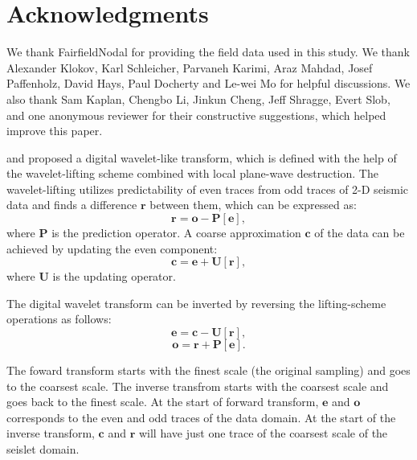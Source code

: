 \section{Acknowledgments}
We thank FairfieldNodal for providing the field data used in this study. We thank Alexander Klokov, Karl Schleicher, Parvaneh Karimi, Araz Mahdad, Josef Paffenholz, David Hays, Paul Docherty and Le-wei Mo for helpful discussions. We also thank Sam Kaplan, Chengbo Li, Jinkun Cheng, Jeff Shragge, Evert Slob, and one anonymous reviewer for their constructive suggestions, which helped improve this paper. 


\newpage
\onecolumn


\newpage
{}
\cite{fomel4} and \cite{seislet} proposed a digital wavelet-like transform, which is defined with the help of the wavelet-lifting scheme \cite[]{lifting} combined with local plane-wave destruction. The wavelet-lifting utilizes predictability of even traces from odd traces of 2-D seismic data and finds a difference $\mathbf{r}$ between them, which can be expressed as:
\begin{equation}
\label{eq:one}
\mathbf{r}=\mathbf{o}-\mathbf{P\left[e\right]},
\end{equation}
where $\mathbf{P}$ is the prediction operator.
A coarse approximation $\mathbf{c}$ of the data can be achieved by updating the even component:
\begin{equation}
\label{eq:two}
\mathbf{c}=\mathbf{e}+\mathbf{U\left[r\right]},
\end{equation}
where $\mathbf{U}$ is the updating operator.

The digital wavelet transform can be inverted by reversing the lifting-scheme operations as follows:
\begin{equation}
\label{eq:three}
\mathbf{e}=\mathbf{c}-\mathbf{U\left[r\right]},
\end{equation}
\begin{equation}
\label{eq:four}
\mathbf{o}=\mathbf{r}+\mathbf{P\left[e\right]}.
\end{equation}

The foward transform starts with the finest scale (the original sampling) and goes to the coarsest scale. The inverse transfrom starts with the coarsest scale and goes back to the finest scale. At the start of forward transform, $\mathbf{e}$ and $\mathbf{o}$ corresponds to the even and odd traces of the data domain. At the start of the inverse transform, $\mathbf{c}$ and $\mathbf{r}$ will have just one trace of the coarsest scale of the seislet domain.

